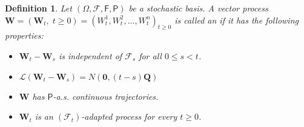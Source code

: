 \documentclass[11pt,notitlepage,a4paper,oneside]{report}
\newtheorem{definition}{Definition}[chapter]
\begin{document}
\begin{definition}
Let $(\Omega,\mathcal{F},\mathsf{F},\mathsf{P})$ be a stochastic
basis. A vector process $\mathbf{W}=(\mathbf{W}_{t},\;t\ge
0)=(W^{1}_{t},W^{2}_{t},\ldots,W^{n}_{t})_{t\ge 0}$ is called an
 if it has the following properties:
\begin{itemize}
\item[$\widetilde{(W1)}$] $\mathbf{W}_{t}-\mathbf{W}_{s}$ is
independent of $\mathcal{F}_{s}$ for all $0\le s<t$.
\item[$\widetilde{(W2)}$]
$\mathcal{L}(\mathbf{W}_{t}-\mathbf{W}_{s})=
N(\mathbf{0},(t-s)\mathbf{Q})$ \item[$\widetilde{(W3)}$]
$\mathbf{W}$ has $\mathsf{P}$-a.s. continuous trajectories.
\item[$\widetilde{(W4)}$] $\mathbf{W}_{t}$ is an
$(\mathcal{F}_{t})$-adapted process for every $t\ge 0$.
\end{itemize}
\end{definition}
\end{document}
